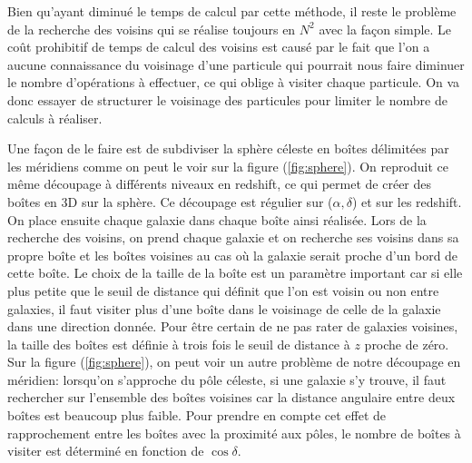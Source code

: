 Bien qu'ayant diminué le temps de calcul par cette méthode, il reste le problème de la recherche des voisins qui se réalise
toujours en $N^2$ avec la façon simple.
Le coût prohibitif de temps de calcul des voisins est causé par le fait que l'on a aucune connaissance du voisinage d'une particule
qui pourrait nous faire diminuer le nombre d'opérations à effectuer, ce qui oblige à visiter chaque particule. On va donc essayer
de structurer le voisinage des particules pour limiter le nombre de calculs à réaliser.

Une façon de le faire est de subdiviser la sphère céleste en boîtes délimitées par les méridiens comme on peut le voir sur la
figure (\ref{fig:sphere}). On reproduit ce même découpage à différents niveaux en redshift, ce qui permet de créer des boîtes en 3D
sur la sphère. Ce découpage est régulier sur ($\alpha,\delta$) et sur les redshift. On place ensuite chaque galaxie dans chaque
boîte ainsi réalisée. Lors de la recherche des voisins, on prend chaque galaxie et on recherche ses voisins dans sa propre boîte et
les boîtes voisines au cas où la galaxie serait proche d'un bord de cette boîte. Le choix de la taille de la boîte est un paramètre
important car si elle plus petite que le seuil de distance qui définit que l'on est voisin ou non entre galaxies, il faut visiter
plus d'une boîte dans le voisinage de celle de la galaxie dans une direction donnée. Pour être certain de ne pas rater de galaxies
voisines, la taille des boîtes est définie à trois fois le seuil de distance à $z$ proche de zéro. Sur la figure
(\ref{fig:sphere}), on peut voir un autre problème de notre découpage en méridien: lorsqu'on s'approche du pôle céleste, si une
galaxie s'y trouve, il faut rechercher sur l'ensemble des boîtes voisines car la distance angulaire entre deux boîtes est beaucoup
plus faible. Pour prendre en compte cet effet de rapprochement entre les boîtes avec la proximité aux pôles, le nombre de boîtes à
visiter est déterminé en fonction de $\cos\delta$.

